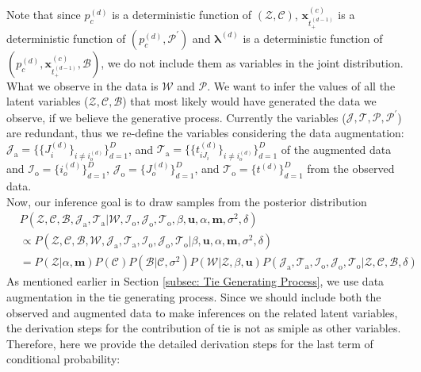 \documentclass[a4paper]{article}
\begin{document}
	  Note that since $p_c^{(d)}$ is a deterministic function of $(\mathcal{Z}, \mathcal{C})$, $\boldsymbol{x}_{t_+^{(d-1)}}^{(c)}$ is a deterministic function of $(p_c^{(d)}, \mathcal{P}^{\prime})$  and $\boldsymbol{\lambda}^{(d)}$ is a deterministic function of $(p_c^{(d)}, \boldsymbol{x}_{t_+^{(d-1)}}^{(c)}, \mathcal{B})$, we do not include them as variables in the joint distribution. \\ \newline
	 What we observe in the data is $\mathcal{W}$ and $\mathcal{P}$. We want to infer the values of all the latent variables ($\mathcal{Z}, \mathcal{C}, \mathcal{B}$) that most likely would have generated the data we observe, if we believe the generative process. Currently the variables ($\mathcal{J}, \mathcal{T}, \mathcal{P}, \mathcal{P^\prime}$) are redundant, thus we re-define the variables considering the data augmentation:   $\mathcal{J}_{\mbox{a}}=\{\{J_i^{(d)}\}_{i\neq i_o^{(d)}}\}_{d=1}^D$, and $\mathcal{T}_{\mbox{a}}=\{\{t_{iJ_i}^{(d)}\}_{i\neq i_o^{(d)}}\}_{d=1}^D$ of the augmented data and $\mathcal{I}_{\mbox{o}}=\{i_o^{(d)}\}_{d=1}^D$,  $\mathcal{J}_{\mbox{o}}=\{J_o^{(d)}\}_{d=1}^D$, and $\mathcal{T}_{\mbox{o}}= \{t^{(d)}\}_{d=1}^D$ from the observed data.\\ \newline
	  Now, our inference goal is to draw samples from the posterior distribution
	  \begin{equation}
	  \begin{aligned}
	  &P(\mathcal{Z}, \mathcal{C}, \mathcal{B}, \mathcal{J}_{\mbox{a}}, \mathcal{T}_{\mbox{a}}|\mathcal{W}, \mathcal{I}_{\mbox{o}}, \mathcal{J}_{\mbox{o}}, \mathcal{T}_{\mbox{o}}, \beta, \boldsymbol{u}, \alpha, \boldsymbol{m}, \sigma^2,  \delta) \\
	  &\propto 	P(\mathcal{Z}, \mathcal{C}, \mathcal{B}, \mathcal{W}, \mathcal{J}_{\mbox{a}}, \mathcal{T}_{\mbox{a}},\mathcal{I}_{\mbox{o}}, \mathcal{J}_{\mbox{o}}, \mathcal{T}_{\mbox{o}} |\beta, \boldsymbol{u}, \alpha, \boldsymbol{m}, \sigma^2, \delta)\\&  = P(\mathcal{Z}|\alpha, \boldsymbol{m})P(\mathcal{C})P(\mathcal{B}|\mathcal{C}, \sigma^2)P(\mathcal{W}|\mathcal{Z}, \beta, \boldsymbol{u})P(\mathcal{J}_{\mbox{a}}, \mathcal{T}_{\mbox{a}},\mathcal{I}_{\mbox{o}}, \mathcal{J}_{\mbox{o}}, \mathcal{T}_{\mbox{o}} |\mathcal{Z}, \mathcal{C}, \mathcal{B}, \delta)
	  \end{aligned}
	  \end{equation}
  As mentioned earlier in Section \ref{subsec: Tie Generating Process}, we use data augmentation in the tie generating process. Since we should include both the observed and augmented data to make inferences on the related latent variables, the derivation steps for the contribution of tie is not as smiple as other variables. Therefore, here we provide the detailed derivation steps for the last term of conditional probability: 
\end{document}
